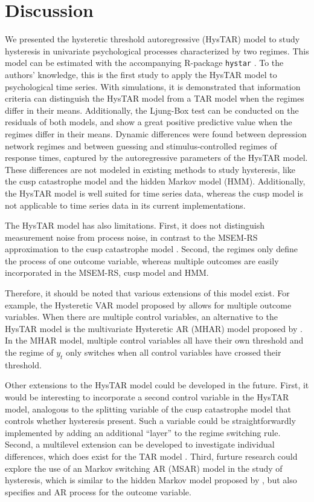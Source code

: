 \documentclass{article}
\begin{document}
\section{Discussion} \label{sec:discussion}
We presented the hysteretic threshold autoregressive (HysTAR) model \citep{bar1, bar2} to study hysteresis in univariate psychological processes characterized by two regimes.
This model can be estimated with the accompanying \textsf{R}-package \texttt{hystar} \citep{R, R_hystar}.
To the authors' knowledge, this is the first study to apply the HysTAR model to psychological time series.
With simulations, it is demonstrated that information criteria can distinguish the HysTAR model from a TAR model when the regimes differ in their means. Additionally, the Ljung-Box test can be conducted on the residuals of both models, and show a great positive predictive value when the regimes differ in their means.
Dynamic differences were found between depression network regimes and between guessing and stimulus-controlled regimes of response times, captured by the autoregressive parameters of the HysTAR model. These differences are not modeled in existing methods to study hysteresis, like the cusp catastrophe model and the hidden Markov model (HMM).
Additionally, the HysTAR model is well suited for time series data, whereas the cusp model is not applicable to time series data in its current implementations.

The HysTAR model has also limitations. 
First, it does not distinguish measurement noise from process noise, in contrast to the MSEM-RS approximation to the cusp catastrophe model \citep{chow2014regime}.
Second, the regimes only define the process of one outcome variable, whereas multiple outcomes are easily incorporated in the MSEM-RS, cusp model and HMM.

Therefore, it should be noted that various extensions of this model exist. 
For example, the Hysteretic VAR model proposed by \citet{chen} allows for multiple outcome variables. 
When there are multiple control variables, an alternative to the HysTAR model is the multivariate Hysteretic AR (MHAR) model proposed by \citet{tsay}. 
In the MHAR model, multiple control variables all have their own threshold and the regime of $y_t$ only switches when all control variables have crossed their threshold. 

Other extensions to the HysTAR model could be developed in the future.
First, it would be interesting to incorporate a second control variable in the HysTAR model, analogous to the splitting variable of the cusp catastrophe model that controls whether hysteresis present.
Such a variable could be straightforwardly implemented by adding an additional ``layer'' to the regime switching rule.
Second, a multilevel extension can be developed to investigate individual differences, which does exist for the TAR model \citep{tar_affect_dyadic1}.
Third, furture research could explore the use of an Markov switching AR (MSAR) model in the study of hysteresis, which is similar to the hidden Markov model proposed by \citet{speedaccuracy}, but also specifies and AR process for the outcome variable.
\end{document}
